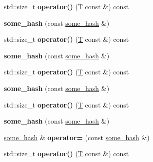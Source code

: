 \begin{DoxyCompactItemize}
std\+::size\+\_\+t {\bfseries operator()} (\mbox{\hyperlink{struct_t}{T}} const \&) const
\item 
\mbox{\label{structsome__hash_a723612fc40aa55a03af0ba2a04ba66c2}} 
{\bfseries some\+\_\+hash} (const \mbox{\hyperlink{structsome__hash}{some\+\_\+hash}} \&)
\item 
\mbox{\label{structsome__hash_a2796c87fba10362bbbcf115a7166ecc0}} 
std\+::size\+\_\+t {\bfseries operator()} (\mbox{\hyperlink{struct_t}{T}} const \&) const
\item 
\mbox{\label{structsome__hash_a723612fc40aa55a03af0ba2a04ba66c2}} 
{\bfseries some\+\_\+hash} (const \mbox{\hyperlink{structsome__hash}{some\+\_\+hash}} \&)
\item 
\mbox{\label{structsome__hash_a2796c87fba10362bbbcf115a7166ecc0}} 
std\+::size\+\_\+t {\bfseries operator()} (\mbox{\hyperlink{struct_t}{T}} const \&) const
\item 
\mbox{\label{structsome__hash_a723612fc40aa55a03af0ba2a04ba66c2}} 
{\bfseries some\+\_\+hash} (const \mbox{\hyperlink{structsome__hash}{some\+\_\+hash}} \&)
\item 
\mbox{\label{structsome__hash_a2796c87fba10362bbbcf115a7166ecc0}} 
std\+::size\+\_\+t {\bfseries operator()} (\mbox{\hyperlink{struct_t}{T}} const \&) const
\item 
\mbox{\label{structsome__hash_a723612fc40aa55a03af0ba2a04ba66c2}} 
{\bfseries some\+\_\+hash} (const \mbox{\hyperlink{structsome__hash}{some\+\_\+hash}} \&)
\item 
\mbox{\label{structsome__hash_a0cea7e5f4ab9f595fe686e3d1356969a}} 
\mbox{\hyperlink{structsome__hash}{some\+\_\+hash}} \& {\bfseries operator=} (const \mbox{\hyperlink{structsome__hash}{some\+\_\+hash}} \&)
\item 
\mbox{\label{structsome__hash_a2796c87fba10362bbbcf115a7166ecc0}} 
std\+::size\+\_\+t {\bfseries operator()} (\mbox{\hyperlink{struct_t}{T}} const \&) const
\item 
\mbox{\label{structsome__hash_a723612fc40aa55a03af0ba2a04ba66c2}} 

\end{DoxyCompactItemize}
